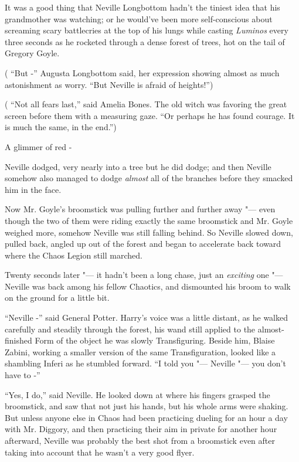It was a good thing that Neville Longbottom hadn't the tiniest idea that
his grandmother was watching; or he would've been more self-conscious
about screaming scary battlecries at the top of his lungs while casting
\emph{Luminos} every three seconds as he rocketed through a dense forest
of trees, hot on the tail of Gregory Goyle.

( ``But -'' Augusta Longbottom said, her expression showing almost as
much astonishment as worry. ``But Neville is afraid of heights!'')

( ``Not all fears last,'' said Amelia Bones. The old witch was favoring
the great screen before them with a measuring gaze. ``Or perhaps he has
found courage. It is much the same, in the end.'')

A glimmer of red -

Neville dodged, very nearly into a tree but he did dodge; and then
Neville somehow also managed to dodge \emph{almost} all of the branches
before they smacked him in the face.

Now Mr. Goyle's broomstick was pulling further and further away "--- even
though the two of them were riding exactly the same broomstick and Mr.
Goyle weighed more, somehow Neville was still falling behind. So Neville
slowed down, pulled back, angled up out of the forest and began to
accelerate back toward where the Chaos Legion still marched.

Twenty seconds later "--- it hadn't been a long chase, just an
\emph{exciting} one "--- Neville was back among his fellow Chaotics, and
dismounted his broom to walk on the ground for a little bit.

``Neville -'' said General Potter. Harry's voice was a little distant,
as he walked carefully and steadily through the forest, his wand still
applied to the almost-finished Form of the object he was slowly
Transfiguring. Beside him, Blaise Zabini, working a smaller version of
the same Transfiguration, looked like a shambling Inferi as he stumbled
forward. ``I told you "--- Neville "--- you don't have to -''

``Yes, I do,'' said Neville. He looked down at where his fingers grasped
the broomstick, and saw that not just his hands, but his whole arms were
shaking. But unless anyone else in Chaos had been practicing dueling for
an hour a day with Mr. Diggory, and then practicing their aim in private
for another hour afterward, Neville was probably the best shot from a
broomstick even after taking into account that he wasn't a very good
flyer.

